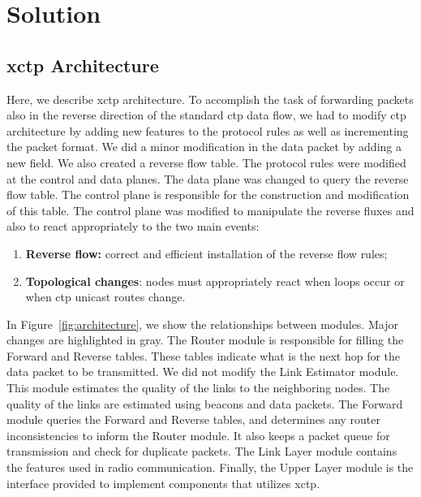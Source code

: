 \section{Solution}
\label{sec:solution}




\subsection{\ac{xctp} Architecture}
\label{sec:architecture}

Here, we describe \ac{xctp} architecture. To accomplish the task of
forwarding packets also in the reverse direction of the standard
\ac{ctp} data flow, we had to modify \ac{ctp} architecture by adding
new features to the protocol rules as well as incrementing the
packet format. We did a minor modification in the data packet by
adding a new field. We also created a reverse flow table. The
protocol rules were modified at the control and data planes. The
data plane was changed to query the reverse flow table. The control
plane is responsible for the construction and modification of this
table. The control plane was modified to manipulate the reverse
fluxes and also to react appropriately to the two main events:

\begin{enumerate}
     \item \textbf {Reverse flow:} correct and efficient installation of the reverse flow rules;
     \item \textbf {Topological changes}: nodes must appropriately react when loops occur or when \ac{ctp} unicast routes change.
\end{enumerate}

In Figure~\ref{fig:architecture}, we show the relationships between
modules. Major changes are highlighted in gray. The Router module is
responsible for filling the Forward and Reverse tables. These tables
indicate what is the next hop for the data packet to be transmitted.
We did not modify the Link Estimator module. This module estimates
the quality of the links to the neighboring nodes. The quality of
the links are estimated using beacons and data packets. The Forward
module queries the Forward and Reverse tables, and determines any
router inconsistencies to inform the Router module. It also keeps a
packet queue for transmission and check for duplicate packets. The
Link Layer module contains the features used in radio communication.
Finally, the Upper Layer module is the interface provided to
implement components that utilizes \ac{xctp}.

